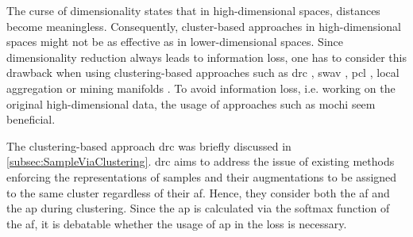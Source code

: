 The curse of dimensionality states that in high-dimensional spaces, distances become meaningless.
Consequently, cluster-based approaches in high-dimensional spaces might not be as effective as in lower-dimensional spaces.
Since dimensionality reduction always leads to information loss, one has to consider this drawback when using clustering-based approaches 
such as \ac{drc} \citet{DRC_2020}, \ac{swav} \citet{swav_2020}, \ac{pcl} \citet{PCL_2021}, 
local aggregation \citet{local_aggr_2019} or mining manifolds \citet{mining_manifolds_2018}.
To avoid information loss, i.e. working on the original high-dimensional data, 
the usage of approaches such as \ac{mochi} \citet{mochi_2020} seem beneficial.

The clustering-based approach \ac{drc} \citet{DRC_2020} was briefly discussed in \autoref{subsec:SampleViaClustering}.
\ac{drc} aims to address the issue of existing methods enforcing the representations of samples 
and their augmentations to be assigned to the same cluster regardless of their \ac{af}.
Hence, they consider both the \ac{af} and the \ac{ap} during clustering.
Since the \ac{ap} is calculated via the softmax function of the \ac{af}, 
it is debatable whether the usage of \ac{ap} in the loss is necessary.